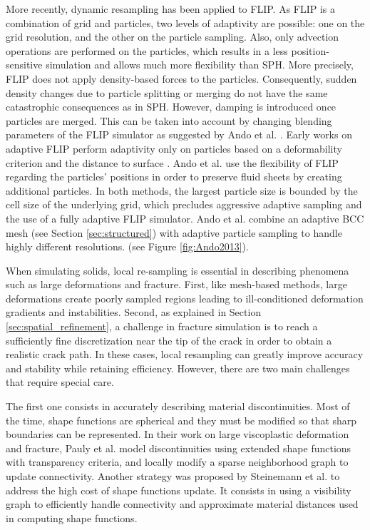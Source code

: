 More recently, dynamic resampling has been applied to FLIP. As FLIP is a combination of grid and particles, two levels of adaptivity are possible: one on the grid resolution, and the other on the particle sampling. Also, only advection operations are performed on the particles, which results in a less position-sensitive simulation and allows much more flexibility than SPH. More precisely, FLIP does not apply density-based forces to the particles. Consequently, sudden density changes due to particle splitting or merging do not have the same catastrophic consequences as in SPH. However, damping is introduced once particles are merged. This can be taken into account by changing blending parameters of the FLIP simulator as suggested by Ando et al. \cite{Ando2012}.
Early works on adaptive FLIP perform adaptivity only on particles based on a deformability criterion and the distance to surface \cite{Hong2008FLIP, Ando2012}. Ando et al. use the flexibility of FLIP regarding the particles' positions in order to preserve fluid sheets by creating additional particles.
In both methods, the largest particle size is bounded by the cell size of the underlying grid, which precludes aggressive adaptive sampling and the use of a fully adaptive FLIP simulator. Ando et al. \cite{Ando2013} combine an adaptive BCC mesh (see Section \ref{sec:structured}) with adaptive particle sampling to handle highly different resolutions. (see Figure \ref{fig:Ando2013}).

When simulating solids, local re-sampling is essential in describing phenomena such as large deformations and fracture. First, like mesh-based methods, large deformations create poorly sampled regions leading to ill-conditioned deformation gradients and instabilities. Second, as explained in Section \ref{sec:spatial_refinement}, a challenge in fracture simulation is to reach a sufficiently fine discretization near the tip of the crack in order to obtain a realistic crack path. In these cases, local resampling can greatly improve accuracy and stability while retaining efficiency. However, there are two main challenges that require special care.

The first one consists in accurately describing material discontinuities. Most of the time, shape functions are spherical and they must be modified so that sharp boundaries can be represented. In their work on large viscoplastic deformation and fracture, Pauly et al. \cite{Pauly2005} model discontinuities using extended shape functions with transparency criteria, and locally modify a sparse neighborhood graph to update connectivity. Another strategy was proposed by Steinemann et al. \cite{Steinemann2009} to address the high cost of shape functions update. It consists in using a visibility graph to efficiently handle connectivity and approximate material distances used in computing shape functions.


